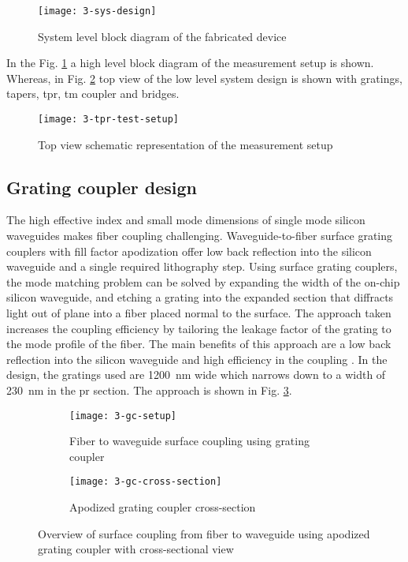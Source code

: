 \documentclass[../report.tex]{subfiles}
\begin{document}
\begin{figure}[H] %
	\centering
	\texttt{[image: 3-sys-design]}
	\caption{System level block diagram of the fabricated device}
	\label{fig:3_sys_design}
\end{figure}
\noindent In the Fig. \ref{fig:3_sys_design} a high level block diagram of the measurement setup is shown. Whereas, in Fig. \ref{fig:3_tpr_test_setup} top view of the low level system design is shown with gratings, tapers, \gls{tpr}, \gls{tm} coupler and bridges. 
\begin{figure}[H] %
	\centering
	\texttt{[image: 3-tpr-test-setup]}
	\caption{Top view schematic representation of the measurement setup}
	\label{fig:3_tpr_test_setup}
\end{figure}

\subsection{Grating coupler design}
The high effective index and small mode dimensions of single mode silicon waveguides makes fiber coupling challenging. Waveguide-to-fiber surface grating couplers with fill factor apodization offer low back reflection into the silicon waveguide and a single required lithography step. Using surface grating couplers, the mode matching problem can be solved by expanding the width of the on-chip silicon waveguide, and etching a grating into the expanded section that diffracts light out of plane into a fiber placed normal to the surface. The approach taken increases the coupling efficiency by tailoring the leakage factor of the grating to the mode profile of the fiber. The main benefits of this approach are a low back reflection into the silicon waveguide and high efficiency in the coupling \cite{grating_coupler}. In the design, the gratings used are \SI{1200}{\nano\meter} wide which narrows down to a width of \SI{230}{\nano\meter} in the \gls{pr} section. The approach is shown in Fig. \ref{fig:3_gc_setup}.

\begin{figure}[H] %
	\begin{subfigure}[t]{0.45\textwidth}
		\texttt{[image: 3-gc-setup]}
		\caption{Fiber to waveguide surface coupling using grating coupler}
		\label{fig:3_gc_setup}
	\end{subfigure}
	\hfill
	\begin{subfigure}[t]{0.45\textwidth}
		\texttt{[image: 3-gc-cross-section]}
		\caption{Apodized grating coupler cross-section}
		\label{fig:3_gc_cross_section}
	\end{subfigure}
	\caption{Overview of surface coupling from fiber to waveguide using apodized grating coupler with cross-sectional view}
\end{figure}
\end{document}
